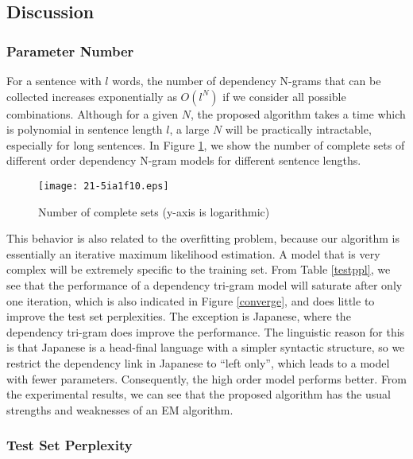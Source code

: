 \documentclass[english]{jnlp_1.4}
\begin{document}
\subsection{Discussion}
\label{sec:disc}

\subsubsection{Parameter Number}

For a sentence with $l$ words, the number of dependency N-grams that can be collected increases exponentially as $O (l^N)$ if we consider all possible combinations. Although for a given $N$, the proposed algorithm takes a time which is polynomial in sentence length $l$, a large $N$ will be practically intractable, especially for long sentences. In Figure \ref{completeset}, we show the number of complete sets of different order dependency N-gram models for different sentence lengths. 

\begin{figure}[b]
\begin{center}
\texttt{[image: 21-5ia1f10.eps]}
\end{center}
\caption{Number of complete sets (y-axis is logarithmic)}
\label{completeset}
\end{figure}

This behavior is also related to the overfitting problem, because our algorithm is essentially an iterative maximum likelihood estimation. A model that is very complex will be extremely specific to the training set.
From Table \ref{testppl}, we see that the performance of a dependency tri-gram model will saturate after only one iteration, which is also indicated in Figure \ref{converge}, and does little to improve the test set perplexities. The exception is Japanese, where the dependency tri-gram does improve the performance. The linguistic reason for this is that Japanese is a head-final language with a simpler syntactic structure, so we restrict the dependency link in Japanese to ``left only'', which leads to a model with fewer parameters. Consequently, the high order model performs better. From the experimental results, we can see that the proposed algorithm has the usual strengths and weaknesses of an EM algorithm.


\subsubsection{Test Set Perplexity}
\end{document}
